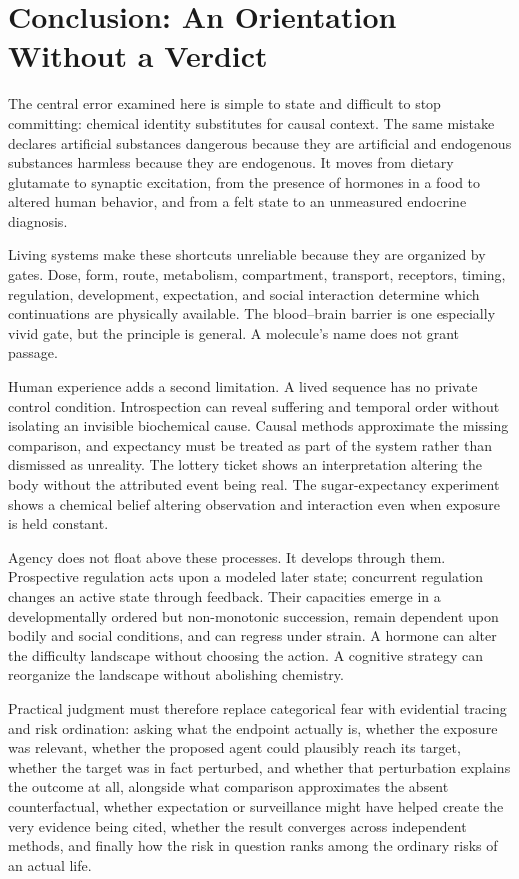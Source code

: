\documentclass[11pt]{article}
\begin{document}
\section{Conclusion: An Orientation Without a Verdict}

The central error examined here is simple to state and difficult to stop committing: chemical identity substitutes for causal context. The same mistake declares artificial substances dangerous because they are artificial and endogenous substances harmless because they are endogenous. It moves from dietary glutamate to synaptic excitation, from the presence of hormones in a food to altered human behavior, and from a felt state to an unmeasured endocrine diagnosis.

Living systems make these shortcuts unreliable because they are organized by gates. Dose, form, route, metabolism, compartment, transport, receptors, timing, regulation, development, expectation, and social interaction determine which continuations are physically available. The blood--brain barrier is one especially vivid gate, but the principle is general. A molecule's name does not grant passage.

Human experience adds a second limitation. A lived sequence has no private control condition. Introspection can reveal suffering and temporal order without isolating an invisible biochemical cause. Causal methods approximate the missing comparison, and expectancy must be treated as part of the system rather than dismissed as unreality. The lottery ticket shows an interpretation altering the body without the attributed event being real. The sugar-expectancy experiment shows a chemical belief altering observation and interaction even when exposure is held constant.

Agency does not float above these processes. It develops through them. Prospective regulation acts upon a modeled later state; concurrent regulation changes an active state through feedback. Their capacities emerge in a developmentally ordered but non-monotonic succession, remain dependent upon bodily and social conditions, and can regress under strain. A hormone can alter the difficulty landscape without choosing the action. A cognitive strategy can reorganize the landscape without abolishing chemistry.

Practical judgment must therefore replace categorical fear with evidential tracing and risk ordination: asking what the endpoint actually is, whether the exposure was relevant, whether the proposed agent could plausibly reach its target, whether the target was in fact perturbed, and whether that perturbation explains the outcome at all, alongside what comparison approximates the absent counterfactual, whether expectation or surveillance might have helped create the very evidence being cited, whether the result converges across independent methods, and finally how the risk in question ranks among the ordinary risks of an actual life.
\end{document}
